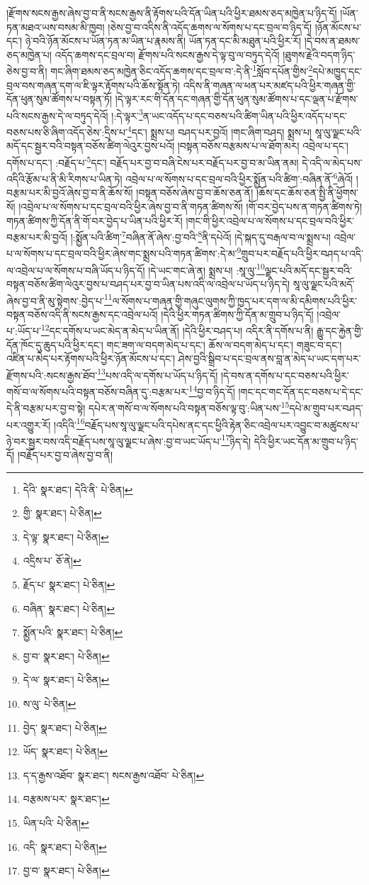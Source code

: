 །རྫོགས་སངས་རྒྱས་ཞེས་བྱ་བ་ནི་སངས་རྒྱས་ནི་རྟོགས་པའི་དོན་ཡིན་པའི་ཕྱིར་ཐམས་ཅད་མཁྱེན་པ་ཉིད་དོ། །ཡོན་ཏན་མཐའ་ཡས་བསམ་མི་ཁྱབ། །ཅེས་བྱ་བ་འདིས་ནི་འདོད་ཆགས་ལ་སོགས་པ་དང་བྲལ་བ་ཉིད་དོ། །ཉོན་མོངས་པ་དང་། ཉེ་བའི་ཉོན་མོངས་པ་ཡོན་ཏན་མ་ཡིན་པ་རྣམས་ནི། ཡོན་ཏན་དང་མི་མཐུན་པའི་ཕྱིར་རོ། །དེ་བས་ན་ཐམས་ཅད་མཁྱེན་པ། འདོད་ཆགས་དང་བྲལ་བ། རྫོགས་པའི་སངས་རྒྱས་དེ་ལྟ་བུ་ལ་བཏུད་དེའོ། །ཐུགས་རྗེའི་བདག་ཉིད་ཅེས་བྱ་བ་ནི། གང་ཞིག་ཐམས་ཅད་མཁྱེན་ཅིང་འདོད་ཆགས་དང་བྲལ་བ་:དེ་ནི་\footnote{དེའི་  སྣར་ཐང་། དེའི་ནི་  པེ་ཅིན། }སློབ་དཔོན་གྱིས་\footnote{གྱི་  སྣར་ཐང་།  པེ་ཅིན། }དཔེ་མཁྱུད་དང་བྲལ་བས་གཞན་དག་ལ་ཇི་ལྟར་རྟོགས་པའི་ཆོས་སྟོན་ཏེ། འདིས་ནི་གཞན་ལ་ཕན་པར་མཛད་པའི་ཕྱིར་གཞན་གྱི་དོན་ཕུན་སུམ་ཚོགས་པ་བསྟན་ཏོ། །དེ་ལྟར་རང་གི་དོན་དང་གཞན་གྱི་དོན་ཕུན་སུམ་ཚོགས་པ་དང་ལྡན་པ་རྫོགས་པའི་སངས་རྒྱས་དེ་ལ་བཏུད་དེའོ། །:དེ་ལྟར་\footnote{དེ་ལྟ་  སྣར་ཐང་།  པེ་ཅིན། }ན་ཡང་འདོད་པ་དང་བཅས་པའི་ཚིག་ཡིན་པའི་ཕྱིར་འདོད་པ་དང་བཅས་པས་ཅི་ཞིག་འདོད་ཅེས་:དྲིས་པ་\footnote{འདྲིས་པ་  ཅོ་ནེ། }དང་། སྨྲས་པ། བཤད་པར་བྱའོ། །གང་ཞིག་བཤད། སྨྲས་པ། སཱ་ལུ་ལྗང་པའི་མདོ་དང་སྦྱར་བའི་བསྟན་བཅོས་ཚིག་ལེའུར་བྱས་པའོ། །བསྟན་བཅོས་བརྩམས་པ་ལ་ཐོག་མར། འབྲེལ་པ་དང་། དགོས་པ་དང་། :བརྗོད་པ་\footnote{རྗོད་པ་  སྣར་ཐང་།  པེ་ཅིན། }དང་། བརྗོད་པར་བྱ་བ་བཞི་ངེས་པར་བརྗོད་པར་བྱ་བ་མ་ཡིན་ནམ། དེ་འདི་ལ་མེད་པས་འདིའི་རྩོམ་པ་ནི་མི་རིགས་པ་ཡིན་ཏེ། འབྲེལ་པ་ལ་སོགས་པ་དང་བྲལ་བའི་ཕྱིར་སྨྱོན་པའི་ཚིག་:བཞིན་ནོ་\footnote{བཞིན་  སྣར་ཐང་།  པེ་ཅིན། }ཞེའོ། །བརྩམ་པར་མི་བྱའོ་ཞེས་བྱ་བ་ནི་ཆོས་སོ། །བསྟན་བཅོས་ཞེས་བྱ་བ་ཆོས་ཅན་ནོ། །ཆོས་དང་ཆོས་ཅན་སྤྱི་ནི་ཕྱོགས་སོ། །འབྲེལ་པ་ལ་སོགས་པ་དང་བྲལ་བའི་ཕྱིར་ཞེས་བྱ་བ་ནི་གཏན་ཚིགས་སོ། །གོ་བར་བྱེད་པས་ན་གཏན་ཚིགས་ཏེ། གཏན་ཚིགས་ཀྱི་དོན་ནི་གོ་བར་བྱེད་པ་ཡིན་པའི་ཕྱིར་རོ། །གང་གི་ཕྱིར་འབྲེལ་པ་ལ་སོགས་པ་དང་བྲལ་བའི་ཕྱིར་བརྩམ་པར་མི་བྱའོ། །:སྨྱོན་པའི་ཚིག་\footnote{སྨྱོན་པའི་  སྣར་ཐང་།  པེ་ཅིན། }བཞིན་ནོ་ཞེས་:བྱ་བའི་\footnote{བྱ་བ་  སྣར་ཐང་།  པེ་ཅིན། }ནི་དཔེའོ། །དེ་སྐད་དུ་བརྒལ་བ་ལ་སྨྲས་པ། འབྲེལ་པ་ལ་སོགས་པ་དང་བྲལ་བའི་ཕྱིར་ཞེས་གང་སྨྲས་པའི་གཏན་ཚིགས་:དེ་མ་\footnote{དེ་ལ་  སྣར་ཐང་།  པེ་ཅིན། }གྲུབ་པར་བརྗོད་པའི་ཕྱིར་བཤད་པ་འདི་ལ་འབྲེལ་པ་ལ་སོགས་པ་བཞི་ཡོད་པ་ཉིད་དོ། །དེ་ཡང་གང་ཞེ་ན། སྨྲས་པ། :སཱ་ལུ་\footnote{ས་ལུ་  པེ་ཅིན། }ལྗང་པའི་མདོ་དང་སྦྱར་བའི་བསྟན་བཅོས་ཚིག་ལེའུར་བྱས་པ་བཤད་པར་བྱ་བ་ཡིན་པས་འདི་ལ་འབྲེལ་པ་ཡོད་པ་ཉིད་དེ། སཱ་ལུ་ལྗང་པའི་མདོ་ཞེས་བྱ་བ་ནི་མུ་སྟེགས་:བྱེད་པ་\footnote{བྱེད་  སྣར་ཐང་།  པེ་ཅིན། }ལ་སོགས་པ་གཞན་གྱི་གཞུང་ལུགས་ཀྱི་ཁྱད་པར་དག་ལ་མི་དམིགས་པའི་ཕྱིར་བསྟན་བཅོས་འདི་ནི་སངས་རྒྱས་དང་འབྲེལ་པའོ། །དེའི་ཕྱིར་གཏན་ཚིགས་ཀྱི་དོན་མ་གྲུབ་པ་ཉིད་དོ། །འབྲེལ་པ་:ཡོད་པ་\footnote{ཡོད་  སྣར་ཐང་།  པེ་ཅིན། }དང་དགོས་པ་ཡང་མེད་ན་མེད་པ་ཡིན་ནོ། །དེའི་ཕྱིར་བཤད་པ། འདིར་ནི་དགོས་པ་ནི། རྒྱུ་དང་རྐྱེན་གྱི་དོན་ཁོང་དུ་ཆུད་པའི་ཕྱིར་དང་། གང་ཟག་ལ་བདག་མེད་པ་དང་། ཆོས་ལ་བདག་མེད་པ་དང་། གཟུང་བ་དང་། འཛིན་པ་མེད་པར་རྟོགས་པའི་ཕྱིར་ཉོན་མོངས་པ་དང་། ཤེས་བྱའི་སྒྲིབ་པ་དང་བྲལ་ནས་བླ་ན་མེད་པ་ཡང་དག་པར་རྫོགས་པའི་:སངས་རྒྱས་ཐོབ་\footnote{ད་ད་རྒྱས་འཐོབ་  སྣར་ཐང་། སངས་རྒྱས་འཐོབ་  པེ་ཅིན། }པས་འདི་ལ་དགོས་པ་ཡོད་པ་ཉིད་དོ། །དེ་བས་ན་དགོས་པ་དང་བཅས་པའི་ཕྱིར་གསོ་བ་ལ་སོགས་པའི་བསྟན་བཅོས་བཞིན་དུ་:བརྩམ་པར་\footnote{བརྩམས་པར་  སྣར་ཐང་། }བྱ་བ་ཉིད་དོ། །གང་དང་གང་དོན་དང་བཅས་པ་དེ་དང་དེ་ནི་བརྩམ་པར་བྱ་བ་སྟེ། དཔེར་ན་གསོ་བ་ལ་སོགས་པའི་བསྟན་བཅོས་ལྟ་བུ་:ཡིན་པས་\footnote{ཡིན་པའི་  པེ་ཅིན། }དཔེ་མ་གྲུབ་པར་བཤད་པར་འགྱུར་རོ། །འདིའི་\footnote{འདི་  སྣར་ཐང་།  པེ་ཅིན། }བརྗོད་པས་སཱ་ལུ་ལྗང་པའི་དཔེས་ནང་དང་ཕྱིའི་རྟེན་ཅིང་འབྲེལ་པར་འབྱུང་བ་མཚུངས་པ་ཉེ་བར་སྦྱར་བས་འདི་བརྗོད་པས་སཱ་ལུ་ལྗང་པ་ཞེས་:བྱ་བ་ཡང་ཡོད་པ་\footnote{བྱ་བ་  སྣར་ཐང་།  པེ་ཅིན། }ཉིད་དེ། དེའི་ཕྱིར་ཡང་དོན་མ་གྲུབ་པ་ཉིད་དོ། །བརྗོད་པར་བྱ་བ་ཞེས་བྱ་བ་ནི། 